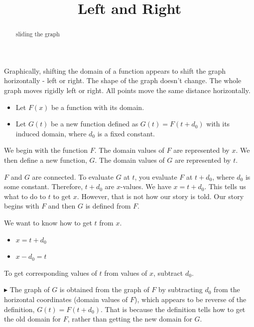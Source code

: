 \documentclass{ximera}
\title{Left and Right}
\begin{document}
\begin{abstract}
sliding the graph
\end{abstract}
\maketitle






Graphically, shifting the domain of a function appears to shift the graph horizontally - left or right.  The shape of the graph doesn't change.  The whole graph moves rigidly left or right.  All points move the same distance horizontally. 


\begin{itemize}
\item Let $F(x)$ be a function with its domain.

\item Let $G(t)$ be a new function defined as $G(t) = F(t+d_0)$ with its induced domain, where $d_0$ is a fixed constant.
\end{itemize}



We begin with the function $F$.  The domain values of $F$ are represented by $x$.  We then define a new function, $G$. The domain values of $G$ are represented by $t$. 

$F$ and $G$ are connected.  To evaluate $G$ at $t$, you evaluate $F$ at $t + d_0$, where $d_0$ is some constant.  Therefore, $t + d_0$ are $x$-values. We have $x = t + d_0$.  This tells us what to do to $t$ to get $x$.  However, that is not how our story is told.  Our story begins with $F$ and then $G$ is defined from $F$.  

We want to know how to get $t$ from $x$.  


\begin{itemize}
\item $x = t + d_0$

\item $x - d_0 = t$
\end{itemize}


To get corresponding values of $t$ from values of $x$, subtract $d_0$.   



$\blacktriangleright$  The graph of $G$ is obtained from the graph of $F$ by subtracting $d_0$ from the horizontal coordinates (domain values of $F$), which appears to be reverse of the definition, $G(t) = F(t+d_0)$.  That is because the definition tells how to get the old domain for $F$, rather than getting the new domain for $G$.
\end{document}
